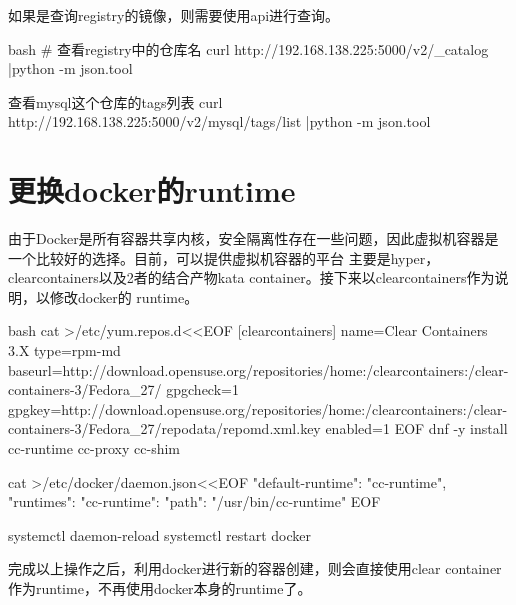 如果是查询registry的镜像，则需要使用api进行查询。
\begin{code-block}{bash}
# 查看registry中的仓库名
curl http://192.168.138.225:5000/v2/_catalog |python -m json.tool

查看mysql这个仓库的tags列表
curl http://192.168.138.225:5000/v2/mysql/tags/list |python -m json.tool
\end{code-block}

\section{更换docker的runtime}
由于Docker是所有容器共享内核，安全隔离性存在一些问题，因此虚拟机容器是一个比较好的选择。目前，可以提供虚拟机容器的平台
主要是hyper，clearcontainers以及2者的结合产物kata container。接下来以clearcontainers作为说明，以修改docker的
runtime。
\begin{code-block}{bash}
cat >/etc/yum.repos.d<<EOF
[clearcontainers]
name=Clear Containers 3.X
type=rpm-md
baseurl=http://download.opensuse.org/repositories/home:/clearcontainers:/clear-containers-3/Fedora_27/
gpgcheck=1
gpgkey=http://download.opensuse.org/repositories/home:/clearcontainers:/clear-containers-3/Fedora_27/repodata/repomd.xml.key
enabled=1
EOF
dnf -y install cc-runtime cc-proxy cc-shim

cat >/etc/docker/daemon.json<<EOF
{
    "default-runtime": "cc-runtime",
    "runtimes": {
        "cc-runtime": {
            "path": "/usr/bin/cc-runtime"
        }
    }
}
EOF

systemctl daemon-reload
systemctl restart docker
\end{code-block}
完成以上操作之后，利用docker进行新的容器创建，则会直接使用clear container作为runtime，不再使用docker本身的runtime了。

